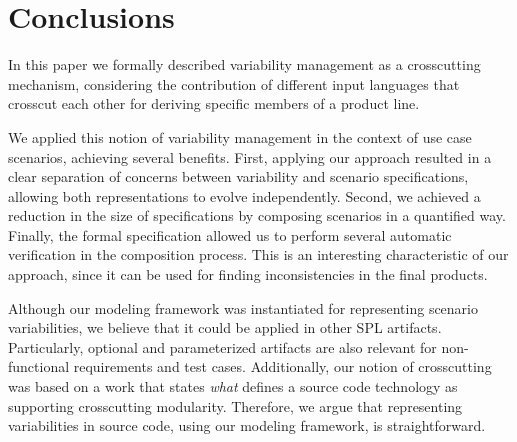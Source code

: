 \documentclass{acm_proc_article-sp}
\begin{document}
\section{Conclusions}\label{sec:conclusions}

In this paper we formally described variability management as a
crosscutting mechanism, considering the contribution
of different input languages that crosscut each other for deriving
specific members of a product line.

We applied this notion of variability management in the context of use
case scenarios, achieving several benefits. First, applying our approach resulted in
a clear separation of concerns between variability and scenario specifications,
allowing both representations to evolve independently. Second, we achieved a reduction
in the size of specifications by composing scenarios in a quantified way. Finally, the
formal specification allowed us to perform several automatic verification in the composition
process. This is an interesting characteristic of our approach, since it can be used
for finding inconsistencies in the final products.

Although our modeling framework was instantiated for representing
scenario variabilities, we believe that it could be applied in
other SPL artifacts. Particularly, optional and parameterized artifacts
are also relevant for non-functional requirements and test cases.
Additionally, our notion of crosscutting was based on a work that states \emph{what}
defines a source code technology as supporting crosscutting modularity. Therefore,
we argue that representing variabilities in source code, using our modeling framework,
is straightforward.


%
%



\end{document}
